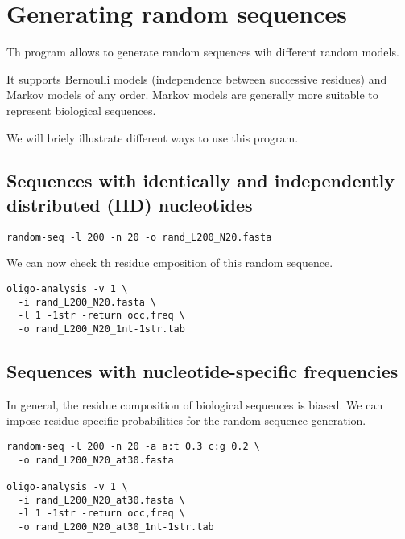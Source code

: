 \chapter{Generating random sequences}

Th program  allows to generate random sequences
wih different random models.

It supports Bernoulli models (independence between successive
residues) and Markov models of any order. Markov models are generally
more suitable to represent biological sequences. 


We will briely illustrate different ways to use this program. 

\section{Sequences with identically and independently distributed (IID) nucleotides}

\begin{small}
\begin{verbatim}
random-seq -l 200 -n 20 -o rand_L200_N20.fasta
\end{verbatim}
\end{small}

We can now check th residue cmposition of this random sequence.

\begin{small}
\begin{verbatim}
oligo-analysis -v 1 \
  -i rand_L200_N20.fasta \
  -l 1 -1str -return occ,freq \
  -o rand_L200_N20_1nt-1str.tab
\end{verbatim}
\end{small}

\section{Sequences with nucleotide-specific frequencies}

In general, the residue composition of biological sequences is
biased. We can impose residue-specific probabilities for the random
sequence generation.

\begin{small}
\begin{verbatim}
random-seq -l 200 -n 20 -a a:t 0.3 c:g 0.2 \
  -o rand_L200_N20_at30.fasta 

oligo-analysis -v 1 \
  -i rand_L200_N20_at30.fasta \
  -l 1 -1str -return occ,freq \
  -o rand_L200_N20_at30_1nt-1str.tab
\end{verbatim}
\end{small}


